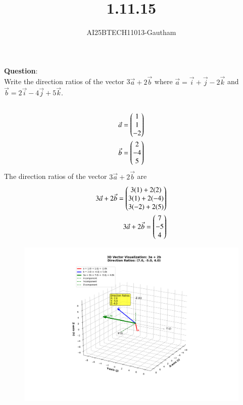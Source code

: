 \documentclass[journal]{IEEEtran}
\begin{document}

\vspace{3cm}

\title{1.11.15}
\author{AI25BTECH11013-Gautham}
 \maketitle
{\let\newpage\relax\maketitle}

\renewcommand{\thefigure}{\theenumi}
\renewcommand{\thetable}{\theenumi}
\setlength{\intextsep}{10pt} %


\renewcommand{\thetable}{\theenumi}                          
\textbf{Question}:\\
Write the direction ratios of the vector 3$\Vec{a}+2\Vec{b}$ where $\Vec{a}=\overrightarrow{i}+\overrightarrow{j}-2\overrightarrow{k}$ and $\Vec{b}=2\overrightarrow{i}-4\overrightarrow{j}+5\overrightarrow{k}$.\\
\solution \\
\begin{align}
\Vec{a}=\begin{pmatrix}1 \\ 1 \\ -2\end{pmatrix} \\
\Vec{b}=\begin{pmatrix}2 \\ -4 \\ 5\end{pmatrix}
\end{align}
The direction ratios of the vector $3\Vec{a}+2\Vec{b}$ are
\begin{align}
    3\Vec{a}+2\Vec{b}=\begin{pmatrix}3(1)+2(2)\\3(1)+2(-4)\\3(-2)+2(5)\end{pmatrix}\\
    3\Vec{a}+2\Vec{b}=\begin{pmatrix}7\\-5\\4\end{pmatrix}
\end{align}
\begin{figure}[ht]
    \centering
    \includegraphics[height=0.6\textheight, keepaspectratio]{figs/fig1.png}
    \label{figure_1}
\end{figure}
\end{document}
